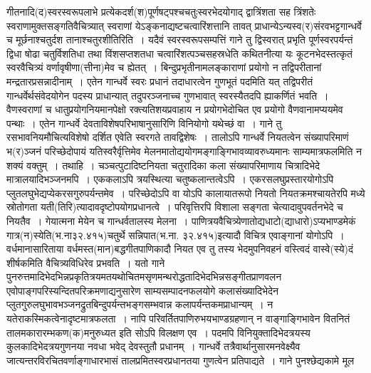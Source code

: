 \documentclass[11pt, openany]{book}
\begin{document}
\noindent
गीतनादि(द)स्वरस्वरूपलाभे प्रत्येकदर्श(श)पूर्णषट्पश्चचतुःस्वरभेदयोगाद् द्वात्रिंशता सह त्रिंशतेः स्वराणामुक्तसङ्गतिवैचित्र्यात् स्वराणां येऽङ्कनाद्यष्टचत्वारिंशत्तानि तावत् प्राधान्येऽन्यस्व(र)संरवभट्टगान्धर्वे च मूर्छनाश्चतुर्दश तानाश्चतुरशीतिरिति~। यदैवं स्वरस्वरूपसम्पत्तिं गाने तु द्विस्वरात् प्रभृति पूर्णस्वरपर्यन्तं द्विधा षोढा चतुर्विशतिधा तथा विंशसप्तशतधा चत्वारिंशत्पञ्चसहस्रधेति कथितनीत्या यः कूटनभेदस्तत्कृतं स्वरवैचित्र्यं वर्णावृषीणा(त्तीना)मेव च ह्येतत्~। बिन्दुप्रभृतीनामलङ्काराणां प्रयोगो न तद्विपरीतानां मन्द्रतारप्रसन्नादीनाम्~। एतेन गान्धर्वे स्वरः प्रधानं तदाधारत्वेन गुणभूतं पदमिति यत् तद्विपरीतं गान्धर्वेर्थसंवेदयोगेन पदस्य प्राधान्यात् तदुपरञ्जनाच्च गुणभावात् स्वरस्यैतदपि ह्याकर्णितं भवति~। वैणस्वराणां च धातुप्रयोगनियमानपेक्षो रक्त्यतिशयप्रवाहाय न प्रयोगभेदोचित एव प्रयोगो वैणवानामप्ययमेव पन्थाः~। एतेन गान्धर्वे देवताविशेषपरिभाषानुसारिणि विनियोगो यथेच्छं वा~। गाने तु रसभावनियमौचित्यविशेषो दर्शित एवेति स्वरगते तावद्विशेषः~। तालोऽपि गान्धर्वे नियतत्वेन संख्यापरिमाणं भ(र)ञ्जनं परिच्छेदोपायं यतिस्वरैर्वृत्तिमेव मेलनमातोद्ययोगमङ्गाङ्गिभावव्यावरुध्यमानः साम्यमात्रफलमिति न शक्यं वक्तुम्~। तथाहि~। चञ्चत्पुटादिष्टनियता चतुरादिका कला संख्यापरिमाणाय चित्रादिभेदे मात्रालयादिभञ्जनमपि~। एककलाऽपि त्रयस्थित्या चतुष्कलान्तत्वेऽपि~। एकरसलघुप्रस्तारयोगोऽपि प्लुतलघुभेद्यप्येकरसगुरुपर्यन्तमेव~। परिच्छेदोऽपि वा योऽपि कालायातरूपो नियतो नियतक्रमश्चायतेरपि मध्ये स्रोतोगता यती(तिरि)त्यादावदृष्टोपयोगप्रधानत्वे~। परिवृत्तिरपि विशाला सङ्गता चेत्यादावुपवर्तनभेदे च नियतैव~। गेयात्मना मेयेन च गान्धर्वतालस्य मेलना~। पाणित्रयवैचित्र्येणातोद्यधाटो(द्याधारो)ऽप्यभाण्डमेकं गात्र(न)स्येति(भ.ना३२.४१५)चतुर्थे सन्निपात(भ.ना. ३२.४१५)इत्यादौ विचित्र एवाङ्गानां योगोऽपि~। वर्धमानासारिताया वर्धमस्त(मान)बद्धगीतपाणिकादौ नियत एव तु तस्य भेदमुपनिवहनं वस्त्विदं वास्वे(स्ये)दं शीर्षकमिति वैचित्र्यविधिरेव प्रभवति~। यतो गाने पुनरुत्तमादिभेदभिन्नप्रकृतित्रयमतयथोचितमसृणमन्थरोद्धतादिभेदभिन्नसङ्गीतप्राणवलन एवोपाङ्गपरिस्यन्दितपरिक्रमणाद्यनुसारेण साम्यसम्पादनफलयोगे कलासंख्यादिभेदेन प्लुतगुरुलघुभावभञ्जनद्रुतबिन्दुपर्यन्तभङ्गसम्भवान्न कलापर्यन्तकमप्राधान्यम्~। न यतेराकस्मिकत्वेनादृष्टमात्रफलता~। नापि परिवर्तितपाणिरुभयभाण्डग्रहणान् न वाङ्गाङ्गिभावेन वितनितं तालमकारारम्भकण(क)मनुरुध्यत इति सोऽपि विलक्षण एव~। पदमपि विनियुक्तादिभेदत्रयस्य कुलकादिभेदत्रयगुणनया नवधा भवेद् देवस्तुतौ प्रधानम्~। गान्धर्वे तत्रैवार्थानुसारमनवेक्ष्यैव जात्यन्तरविरचितवर्णाङ्गाधारभासं तालप्रमितस्वरप्रधानतया गुणत्वेन प्रतिपाद्यते~। गाने पुनश्छेद्यकामे मूल 


 
\end{document}
